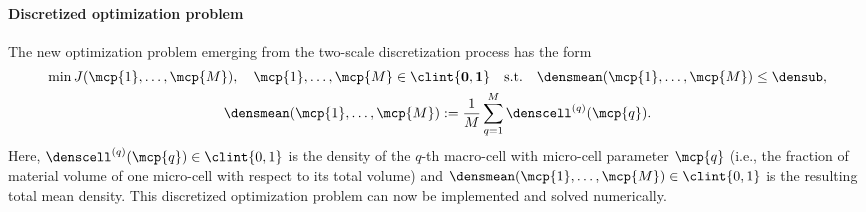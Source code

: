 \vspace{-0.5em}

\paragraph{Discretized optimization problem}

The new optimization problem emerging from the
two-scale discretization process has the form
\begin{subequations}
  \label{eq:topoOptProblemDiscrete}
  \setlength{\belowdisplayskip}{5pt}%
  \begin{gather}
    \min J(\mcp{1}, \dotsc, \mcp{M}),\quad
    \mcp{1}, \dotsc, \mcp{M} \in \clint{\*0, \*1}
    \quad\text{s.t.}\quad
    \densmean(\mcp{1}, \dotsc, \mcp{M}) \le \densub,\\
    \densmean(\mcp{1}, \dotsc, \mcp{M})
    := \frac{1}{M} \sum_{q=1}^M \denscell^{(q)}(\mcp{q}).
  \end{gather}
\end{subequations}
Here, $\denscell^{(q)}(\mcp{q}) \in \clint{0, 1}$ is the
density of the $q$-th macro-cell with micro-cell parameter $\mcp{q}$
(i.e., the fraction of material volume of one micro-cell
with respect to its total volume)
and $\densmean(\mcp{1}, \dotsc, \mcp{M}) \in \clint{0, 1}$
is the resulting total mean density.
This discretized optimization problem can now be implemented and
solved numerically.
